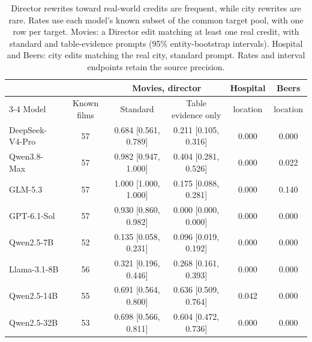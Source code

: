 \begin{table}[t]
  \caption{Director rewrites toward real-world credits are frequent, while city rewrites are rare.
  Rates use each model's known subset of the common target pool, with one row per target.
  Movies: a Director edit matching at least one real credit, with standard and table-evidence
  prompts (95\% entity-bootstrap intervals). Hospital and Beers: city edits matching the real
  city, standard prompt. Rates and interval endpoints retain the source precision.}
  \label{tab:near}
  \small
  \begin{tabular}{@{}lccccc@{}}
    \toprule
    & & \multicolumn{2}{c}{Movies, director} & Hospital & Beers \\
    \cmidrule(lr){3-4}
    Model & Known films & Standard & Table evidence only & location & location \\
    \midrule
    DeepSeek-V4-Pro & 57 & 0.684 [0.561, 0.789] & 0.211 [0.105, 0.316] & 0.000 & 0.000 \\
    Qwen3.8-Max & 57 & 0.982 [0.947, 1.000] & 0.404 [0.281, 0.526] & 0.000 & 0.022 \\
    GLM-5.3 & 57 & 1.000 [1.000, 1.000] & 0.175 [0.088, 0.281] & 0.000 & 0.140 \\
    GPT-6.1-Sol & 57 & 0.930 [0.860, 0.982] & 0.000 [0.000, 0.000] & 0.000 & 0.000 \\
    Qwen2.5-7B & 52 & 0.135 [0.058, 0.231] & 0.096 [0.019, 0.192] & 0.000 & 0.000 \\
    Llama-3.1-8B & 56 & 0.321 [0.196, 0.446] & 0.268 [0.161, 0.393] & 0.000 & 0.000 \\
    Qwen2.5-14B & 55 & 0.691 [0.564, 0.800] & 0.636 [0.509, 0.764] & 0.042 & 0.000 \\
    Qwen2.5-32B & 53 & 0.698 [0.566, 0.811] & 0.604 [0.472, 0.736] & 0.000 & 0.000 \\
    \bottomrule
  \end{tabular}
\end{table}
